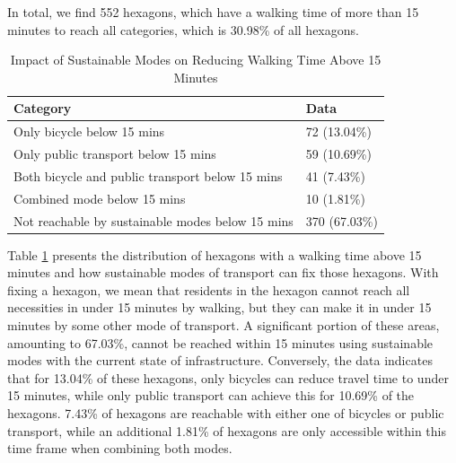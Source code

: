 In total, we find 552 hexagons, which have a walking time of more than 15 minutes to reach all categories, which is 30.98\% of all hexagons.
\begin{table}[h]
  \centering
  \begin{tabular}{|l|l|}
    \hline
    \textbf{Category}                                          & \textbf{Data}                \\ \hline
    Only bicycle below 15 mins                                 & 72 (13.04\%)                 \\ \hline
    Only public transport below 15 mins                        & 59 (10.69\%)                 \\ \hline
    Both bicycle and public transport below 15 mins            & 41 (7.43\%)                  \\ \hline
    Combined mode below 15 mins                                & 10 (1.81\%)                  \\ \hline
    Not reachable by sustainable modes below 15 mins           & 370 (67.03\%)                \\ \hline
  \end{tabular}
  \caption{Impact of Sustainable Modes on Reducing Walking Time Above 15 Minutes}
  \label{table:hexagons_with_walking_time_above_15_minutes}
\end{table}
Table \ref{table:hexagons_with_walking_time_above_15_minutes} presents the distribution of hexagons with a walking time above 15 minutes and how sustainable modes of transport can fix those hexagons.
With fixing a hexagon, we mean that residents in the hexagon cannot reach all necessities in under 15 minutes by walking, but they can make it in under 15 minutes by some other mode of transport.
A significant portion of these areas, amounting to 67.03\%, cannot be reached within 15 minutes using sustainable modes with the current state of infrastructure. 
Conversely, the data indicates that for 13.04\% of these hexagons, only bicycles can reduce travel time to under 15 minutes, while only public transport can achieve this for 10.69\% of the hexagons. 
7.43\% of hexagons are reachable with either one of bicycles or public transport, while an additional 1.81\% of hexagons are only accessible within this time frame when combining both modes. 


